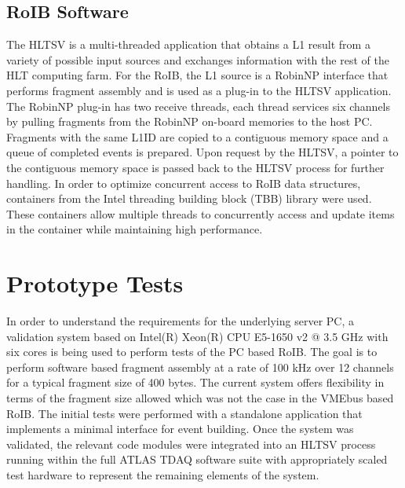 \documentclass{JINST}
\begin{document}
\subsection{RoIB Software}\label{sec:crorc_sw}

The HLTSV is a multi-threaded application that obtains a L1 result from a variety of possible input sources and exchanges information with the 
rest of the HLT computing farm. 
For the RoIB, the L1 source is a RobinNP interface that performs fragment assembly and is used as a plug-in to the HLTSV application.
The RobinNP plug-in has two receive threads, each 
thread services six channels by pulling fragments from the RobinNP on-board memories to the host PC.
Fragments with the same L1ID are copied 
to a contiguous memory space and a queue of completed events is prepared. 
Upon request by the HLTSV, a pointer to the contiguous memory space is passed back to the 
HLTSV process for further handling. In order to optimize concurrent access to RoIB data structures, containers from the  Intel 
threading building block (TBB) library were used. These containers allow multiple threads to concurrently access and update items 
in the container while maintaining high performance.  


\section{Prototype Tests}\label{sec:perf}

In order to understand the requirements for the underlying server PC, a validation system based on Intel(R) Xeon(R) CPU E5-1650 v2 
@ 3.5 GHz with six cores is being used to perform tests of the PC based RoIB. 
The goal is to perform software based fragment assembly at a rate of 100 kHz over 12 channels for a typical 
fragment size of 400 bytes. The current system offers flexibility in terms of the fragment size allowed which was not the case in the 
VMEbus based RoIB. The initial tests were performed with a standalone application that implements a minimal interface for event building. 
Once the system was validated, the relevant code modules were integrated into an HLTSV process running within the full ATLAS TDAQ 
software suite with appropriately scaled test hardware to represent the remaining elements of the system.
\end{document}
